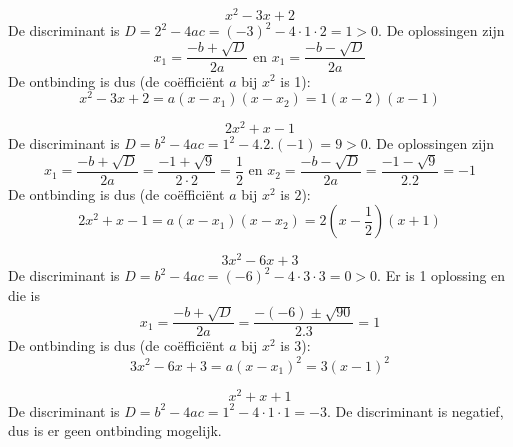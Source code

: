 \begin{voorbeeld}
	\begin{equation*}
	x^2-3x+2
	\end{equation*}
	De discriminant is $D=2^2-4ac=(-3)^2-4\cdot1\cdot2=1>0$. De oplossingen zijn
	\begin{equation*}
	x_1=\frac{-b+\sqrt{D}}{2a} \text{ en } x_1=\frac{-b-\sqrt{D}}{2a}
	\end{equation*}
De ontbinding is dus (de co\"effici\"ent $a$ bij $x^2$ is 1):
\begin{equation*}
x^2-3x+2=a(x-x_1)(x-x_2)=1(x-2)(x-1)
\end{equation*}
\end{voorbeeld}
\begin{voorbeeld}
\begin{equation*}
2x^2+x-1
\end{equation*}
De discriminant is $D=b^2-4ac=1^2-4.2.(-1)=9>0$. De oplossingen zijn
\begin{equation*}
x_1 = \frac{-b + \sqrt{D}}{2a}=\frac{-1+\sqrt{9}}{2\cdot2}=\frac{1}{2} \text{ en } x_2 = \frac{-b - \sqrt{D}}{2a}=\frac{-1-\sqrt{9}}{2.2}=-1
\end{equation*}
De ontbinding is dus (de co\"effici\"ent $a$ bij $x^2$ is $2$):
\begin{equation*}
2x^2+x-1=a(x-x_1)(x-x_2)=2(x-\frac{1}{2})(x+1)
\end{equation*}
\end{voorbeeld}
\begin{voorbeeld}
\begin{equation*}
3x^2-6x+3
\end{equation*}
	De discriminant is $D=b^2-4ac=(-6)^2-4\cdot3\cdot3=0>0$. Er is 1 oplossing en die is
	\begin{equation*}
	x_1 = \frac{-b + \sqrt{D}}{2a}=\frac{-(-6)\pm\sqrt{90}}{2.3}=1
	\end{equation*}
De ontbinding is dus (de co\"effici\"ent $a$ bij $x^2$ is 3):
\begin{equation*}
3x^2-6x+3 = a(x-x_1)^2=3(x-1)^2
\end{equation*}
\end{voorbeeld}
\begin{voorbeeld}
	\begin{equation*}
	x^2+x+1
	\end{equation*}
	De discriminant is $D=b^2-4ac=1^2-4\cdot1\cdot1=-3$. De discriminant is negatief, dus is er geen ontbinding mogelijk.
\end{voorbeeld}


